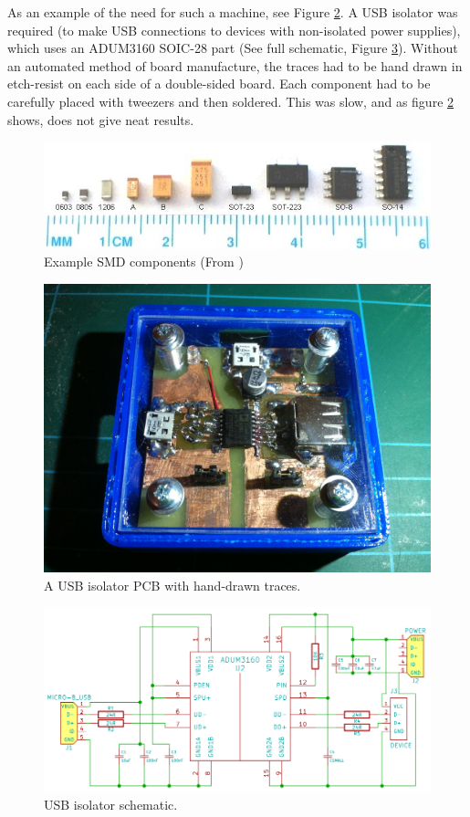 As an example of the need for such a machine, see Figure \ref{usbisolator}. A USB isolator was required (to make USB connections to devices with non-isolated
power supplies), which uses an ADUM3160 SOIC-28 part (See full schematic, Figure \ref{usbisolatorschem}). Without an automated method of board manufacture, the
traces had to be hand drawn in etch-resist on each side of a double-sided board. Each component had to be carefully
placed with tweezers and then soldered. This was slow, and as figure \ref{usbisolator} shows, does not give
neat results.


\begin{figure}[ht!]
\centering
\includegraphics[width=150mm]{resources/SMDsizes.jpg}
\caption{Example SMD components (From \cite{fpga4fun})}
\label{overflow}
\end{figure}

\begin{figure}[ht!]
\centering
\includegraphics[width=120mm]{resources/usbisolator.jpg}
\caption{A USB isolator PCB with hand-drawn traces.}
\label{usbisolator}
\end{figure}

\begin{figure}[ht!]
\centering
\includegraphics[width=120mm]{resources/isolatorschem.png}
\caption{USB isolator schematic.}
\label{usbisolatorschem}
\end{figure}

